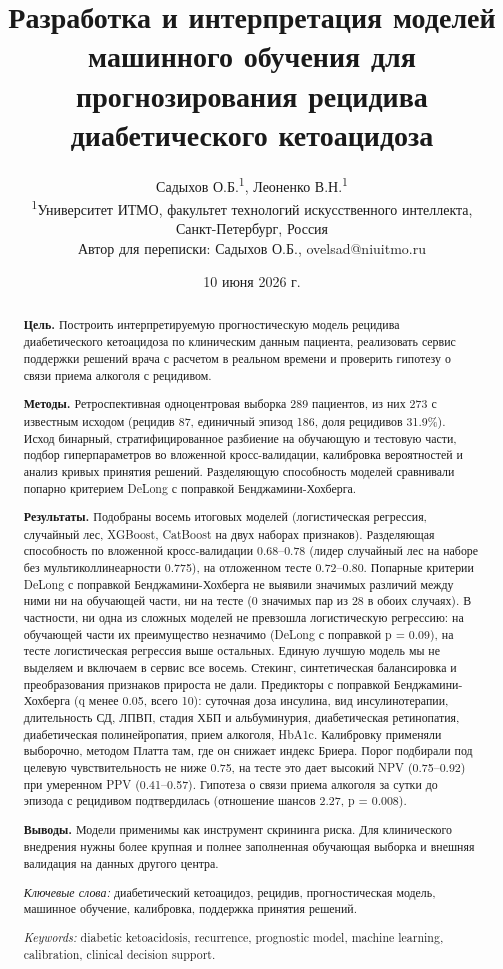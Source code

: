 \documentclass[12pt,a4paper]{article}
\title{\bfseries Разработка и интерпретация моделей машинного обучения для прогнозирования рецидива диабетического кетоацидоза}
\author{
  Садыхов О.Б.\textsuperscript{1}, Леоненко В.Н.\textsuperscript{1} \\[6pt]
  \small \textsuperscript{1}Университет ИТМО, факультет технологий искусственного интеллекта, \\
  \small Санкт-Петербург, Россия \\
  \small Автор для переписки: Садыхов О.Б., ovelsad@niuitmo.ru
}
\date{10 июня 2026 г.}
\begin{document}
\maketitle

\begin{abstract}
\noindent
\textbf{Цель.} Построить интерпретируемую прогностическую модель рецидива
диабетического кетоацидоза по клиническим данным пациента, реализовать сервис
поддержки решений врача с расчетом в реальном времени и проверить гипотезу о связи приема
алкоголя с рецидивом.

\noindent
\textbf{Методы.} Ретроспективная одноцентровая выборка 289 пациентов, из них 273 с
известным исходом (рецидив 87, единичный эпизод 186, доля рецидивов 31.9\%). Исход
бинарный, стратифицированное разбиение на обучающую и тестовую части, подбор
гиперпараметров во вложенной кросс-валидации, калибровка вероятностей и анализ кривых
принятия решений. Разделяющую способность моделей сравнивали попарно критерием DeLong
с поправкой Бенджамини-Хохберга.

\noindent
\textbf{Результаты.} Подобраны восемь итоговых моделей (логистическая регрессия,
случайный лес, XGBoost, CatBoost на двух наборах признаков). Разделяющая способность по
вложенной кросс-валидации 0.68--0.78 (лидер случайный лес на наборе без
мультиколлинеарности 0.775), на отложенном тесте 0.72--0.80. Попарные критерии DeLong с
поправкой Бенджамини-Хохберга не выявили значимых различий между ними ни на
обучающей части, ни на тесте (0 значимых пар из 28 в обоих случаях). В частности, ни одна
из сложных моделей не превзошла логистическую регрессию: на обучающей части их
преимущество незначимо (DeLong с поправкой p = 0.09), на тесте логистическая регрессия
выше остальных. Единую лучшую модель мы не выделяем и включаем в сервис все восемь.
Стекинг, синтетическая балансировка и преобразования признаков прироста не дали.
Предикторы с поправкой Бенджамини-Хохберга (q менее 0.05, всего 10): суточная доза
инсулина, вид инсулинотерапии, длительность СД, ЛПВП, стадия ХБП и альбуминурия,
диабетическая ретинопатия, диабетическая полинейропатия, прием алкоголя, HbA1c. Калибровку применяли выборочно, методом
Платта там, где он снижает индекс Бриера. Порог подбирали под целевую чувствительность не
ниже 0.75, на тесте это дает высокий NPV (0.75--0.92) при умеренном PPV (0.41--0.57). Гипотеза о связи
приема алкоголя за сутки до эпизода с рецидивом подтвердилась (отношение шансов 2.27,
p = 0.008).

\noindent
\textbf{Выводы.} Модели применимы как инструмент скрининга риска. Для клинического
внедрения нужны более крупная и полнее заполненная обучающая выборка и внешняя валидация
на данных другого центра.

\vspace{6pt}
\noindent
\textit{Ключевые слова:} диабетический кетоацидоз, рецидив, прогностическая модель,
машинное обучение, калибровка, поддержка принятия решений.

\vspace{2pt}
\noindent
\textit{Keywords:} diabetic ketoacidosis, recurrence, prognostic model, machine
learning, calibration, clinical decision support.
\end{abstract}
\end{document}
